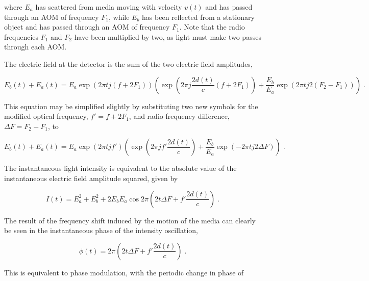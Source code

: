 \noindent where $E_a$ has scattered from media moving with velocity $v(t)$ and has passed through an AOM of frequency $F_1$, while $E_b$ has been reflected from a stationary object and has passed through an AOM of frequency $F_1$. Note that the radio frequencies $F_1$ and $F_2$ have been multiplied by two, as light must make two passes through each AOM.

The electric field at the detector is the sum of the two electric field amplitudes,

\begin{dmath}
E_b(t) + E_a(t) = E_a \exp{(2 \pi t j (f + 2 F_1))}\left(\exp{\left(2 \pi j \frac{2 d(t)}{c}(f + 2 F_1)\right)} + \frac{E_b}{E_a} \exp{(2 \pi t j 2 (F_2 - F_1))}\right) \; .
\end{dmath}

This equation may be simplified slightly by substituting two new symbols for the modified optical frequency, $f' = f + 2 F_1$, and radio frequency difference, $\Delta F = F_2 - F_1$, to

\begin{dmath}
E_b(t) + E_a(t) = E_a \exp{(2 \pi t j f')}\left(\exp{\left(2 \pi j f' \frac{ 2 d(t)}{c}\right)} + \frac{E_b}{E_a} \exp{(-2 \pi t j 2 \Delta F)}\right) \; .
\end{dmath}

The instantaneous light intensity is equivalent to the absolute value of the instantaneous electric field amplitude squared, given by


\begin{dmath}
I(t) = E_a^2 + E_b^2 + 2 E_b E_a \cos{ 2 \pi \left(2 t \Delta F + f' \frac{2 d(t)}{c}   \right)} \; .
\end{dmath}

The result of the frequency shift induced by the motion of the media can clearly be seen in the instantaneous phase of the intensity oscillation,

\begin{dmath}
\label{eq:phase_aom_Doppler}
\phi(t) = 2 \pi \left(2 t \Delta F + f' \frac{2 d(t)}{c}   \right) \; .
\end{dmath}

This is equivalent to phase modulation, with the periodic change in phase of

